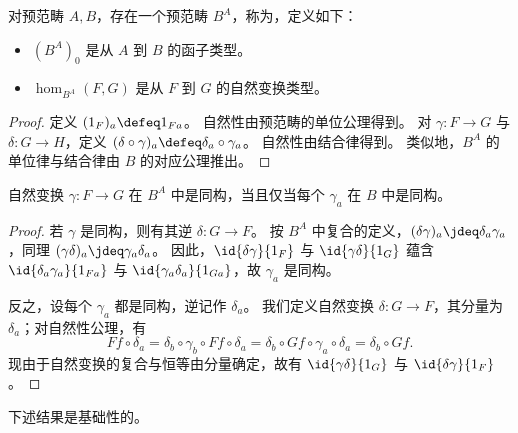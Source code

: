\begin{defn}\label{ct:functor-precat}
  对预范畴 $A,B$，存在一个预范畴 $B^A$，称为，定义如下：
  \begin{itemize}
  \item $(B^A)_0$ 是从 $A$ 到 $B$ 的函子类型。
  \item $\hom_{B^A}(F,G)$ 是从 $F$ 到 $G$ 的自然变换类型。
  \end{itemize}
\end{defn}
\begin{proof}
  定义 $(1_F)_a\defeq 1_{Fa}$。
  自然性由预范畴的单位公理得到。
  对 $\gamma:F\to G$ 与 $\delta:G\to H$，定义 $(\delta\circ\gamma)_a\defeq \delta_a\circ \gamma_a$。
  自然性由结合律得到。
  类似地，$B^A$ 的单位律与结合律由 $B$ 的对应公理推出。
\end{proof}

\begin{lem}\label{ct:natiso}
  自然变换 $\gamma:F\to G$ 在 $B^A$ 中是同构，当且仅当每个 $\gamma_a$ 在 $B$ 中是同构。
\end{lem}
\begin{proof}
  若 $\gamma$ 是同构，则有其逆 $\delta:G\to F$。
  按 $B^A$ 中复合的定义，$(\delta\gamma)_a\jdeq \delta_a\gamma_a$，同理 $(\gamma\delta)_a\jdeq \gamma_a\delta_a$。
  因此，$\id{\delta\gamma}{1_F}$ 与 $\id{\gamma\delta}{1_G}$ 蕴含 $\id{\delta_a\gamma_a}{1_{Fa}}$ 与 $\id{\gamma_a\delta_a}{1_{Ga}}$，故 $\gamma_a$ 是同构。

  反之，设每个 $\gamma_a$ 都是同构，逆记作 $\delta_a$。
我们定义自然变换 $\delta:G\to F$，其分量为 $\delta_a$；对自然性公理，有
  \[ Ff\circ \delta_a = \delta_b\circ \gamma_b\circ Ff \circ \delta_a = \delta_b\circ Gf\circ \gamma_a\circ \delta_a = \delta_b\circ Gf. \]
  现由于自然变换的复合与恒等由分量确定，故有 $\id{\gamma\delta}{1_G}$ 与 $\id{\delta\gamma}{1_F}$。
\end{proof}

下述结果是基础性的。

